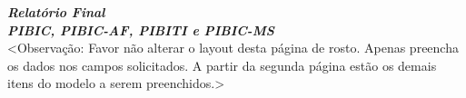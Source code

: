 \documentclass{article}
\begin{document}

\begin{center}
    \fontsize{16pt}{11.5}\selectfont\textbf{\textit{{Relatório Final}}}\\
    \vspace{0.2cm}
    \fontsize{12pt}{11.5}\selectfont\textbf{\textit{PIBIC, PIBIC-AF, PIBITI e PIBIC-MS}}\\
    \vspace{0.3cm}
    \fontsize{10pt}{11.5}\selectfont<Observação: Favor não alterar o layout desta página de rosto. Apenas preencha os dados nos campos solicitados. A partir da segunda página estão os demais itens do modelo a serem preenchidos.>
    
\vspace{0.5cm}






\vspace{0.5cm}

\end{center}

\pagebreak  


\begin{caixa}

\end{caixa}


\begin{caixa}[INTRODUÇÃO]
    
\end{caixa}

\end{document}
